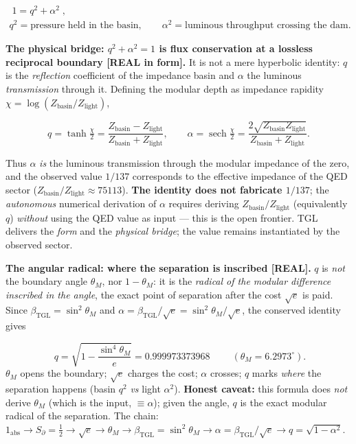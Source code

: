\documentclass[11pt]{article}
\newcommand{\bTGL}{\beta_{\mathrm{TGL}}}\newcommand{\Msun}{M_{\odot}}\newcommand{\TGL}{\mathrm{TGL}}
\theoremstyle{definition}\newtheorem{deriv}{Derivation}
\begin{document}
\begin{equation}\begin{gathered}\boxed{\;1=q^2+\alpha^2\;},\\ q^2=\text{pressure held in the basin},\qquad \alpha^2=\text{luminous throughput crossing the dam}.\end{gathered}\end{equation}

\textbf{The physical bridge: $q^2+\alpha^2=1$ is flux conservation at a lossless reciprocal boundary \textsf{[REAL in form]}.} It is not a mere hyperbolic identity: $q$ is the \emph{reflection} coefficient of the impedance basin and $\alpha$ the luminous \emph{transmission} through it. Defining the modular depth as impedance rapidity $\chi=\log(Z_{\mathrm{basin}}/Z_{\mathrm{light}})$,

\begin{equation}q=\tanh\tfrac\chi2=\frac{Z_{\mathrm{basin}}-Z_{\mathrm{light}}}{Z_{\mathrm{basin}}+Z_{\mathrm{light}}},\qquad \alpha=\operatorname{sech}\tfrac\chi2=\frac{2\sqrt{Z_{\mathrm{basin}}Z_{\mathrm{light}}}}{Z_{\mathrm{basin}}+Z_{\mathrm{light}}}.\end{equation}

Thus $\alpha$ \emph{is} the luminous transmission through the modular impedance of the zero, and the observed value $1/137$ corresponds to the effective impedance of the QED sector ($Z_{\mathrm{basin}}/Z_{\mathrm{light}}\approx75113$). \textbf{The identity does not fabricate $1/137$}; the \emph{autonomous} numerical derivation of $\alpha$ requires deriving $Z_{\mathrm{basin}}/Z_{\mathrm{light}}$ (equivalently $q$) \emph{without} using the QED value as input --- this is the open frontier. TGL delivers the \emph{form} and the \emph{physical bridge}; the value remains instantiated by the observed sector.

\textbf{The angular radical: where the separation is inscribed \textsf{[REAL]}.} $q$ is \emph{not} the boundary angle $\theta_M$, nor $1-\theta_M$: it is the \emph{radical of the modular difference inscribed in the angle}, the exact point of separation after the cost $\sqrt e$ is paid. Since $\bTGL=\sin^2\theta_M$ and $\alpha=\bTGL/\sqrt e=\sin^2\theta_M/\sqrt e$, the conserved identity gives

\begin{equation}\boxed{\;q=\sqrt{1-\frac{\sin^4\theta_M}{e}}=0.999973373968\;}\qquad(\theta_M=6.2973^\circ).\end{equation}\noindent $\theta_M$ opens the boundary; $\sqrt e$ charges the cost; $\alpha$ crosses; $q$ marks \emph{where} the separation happens (basin $q^2$ \emph{vs} light $\alpha^2$). \textbf{Honest caveat:} this formula does \emph{not} derive $\theta_M$ (which is the input, $\equiv\alpha$); given the angle, $q$ is the exact modular radical of the separation. The chain: $1_{\mathrm{abs}}\to S_\partial=\tfrac12\to\sqrt e\to\theta_M\to\bTGL=\sin^2\theta_M\to\alpha=\bTGL/\sqrt e\to q=\sqrt{1-\alpha^2}$.
\end{document}
